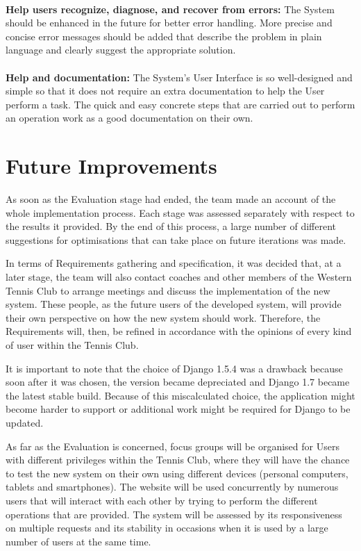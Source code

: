 \documentclass{l3proj}
\begin{document}
 \\
\textbf{Help users recognize, diagnose, and recover from errors:}
The System should be enhanced in the future for better error handling. More precise and concise error messages should be added that describe the problem in plain language and clearly suggest the appropriate solution.\\
 \\
\textbf{Help and documentation:}
The System’s User Interface is so well-designed and simple so that it does not require an extra documentation to help the User perform a task. The quick and easy concrete steps that are carried out to perform an operation work as a good documentation on their own.\\

\section{Future Improvements}
As soon as the Evaluation stage had ended, the team made an account of the whole implementation process. Each stage was assessed separately with respect to the results it provided. By the end of this process, a large number of different suggestions for optimisations that can take place on future iterations was made.\\
\par In terms of Requirements gathering and specification, it was decided that, at a later stage, the team will also contact coaches and other members of the Western Tennis Club to arrange meetings and discuss the implementation of the new system. These people, as the future users of the developed system, will provide their own perspective on how the new system should work. Therefore, the Requirements will, then, be refined in accordance with the opinions of every kind of user within the Tennis Club.\\
\par It is important to note that the choice of Django 1.5.4 was a drawback because soon after it was chosen, the version became depreciated and Django 1.7 became the latest stable build. Because of this miscalculated choice, the application might become harder to support or additional work might be required for Django to be updated.\\
\par As far as the Evaluation is concerned, focus groups will be organised for Users with different privileges within the Tennis Club, where they will have the chance to test the new system on their own using different devices (personal computers, tablets and smartphones). The website will be used concurrently by numerous users that will interact with each other by trying to perform the different operations that are provided.  The system will be assessed by its responsiveness on multiple requests and its stability in occasions when it is used by a large number of users at the same time. 



\end{document}
